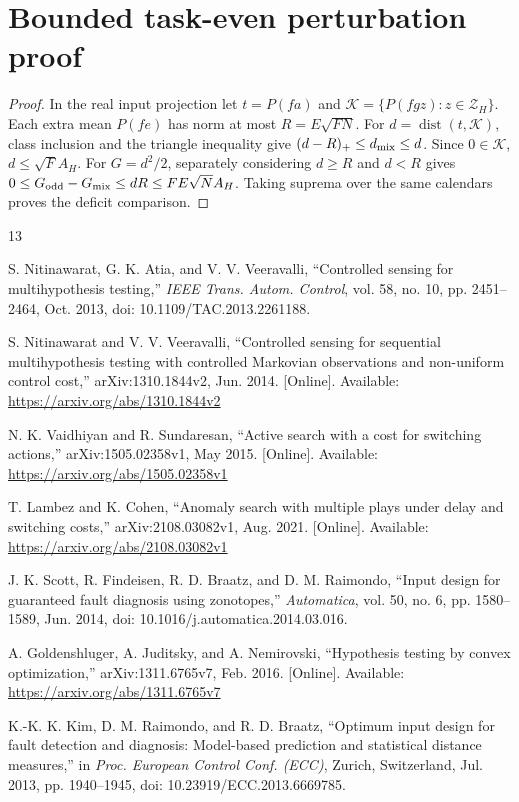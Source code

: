 \documentclass[journal]{IEEEtran}
\begin{document}
\section{Bounded task-even perturbation proof}\label{sf:even-proof}
\begin{proof}\leavevmode
In the real input projection let $t=P(fa)$ and
$\mathcal K=\{P(fgz):z\in\mathcal Z_H\}$.
Each extra mean $P(fe)$ has norm at most $R=E\sqrt{FN}$.
For $d=\operatorname{dist}(t,\mathcal K)$, class inclusion and the triangle
inequality give $(d-R)_+\le d_{\rm mix}\le d$.
Since $0\in\mathcal K$, $d\le\sqrt F A_H$.
For $G=d^2/2$, separately considering $d\ge R$ and $d<R$ gives
$0\le G_{\rm odd}-G_{\rm mix}\le dR\le FE\sqrt N A_H$.
Taking suprema over the same calendars proves the deficit comparison.
\end{proof}
\begin{thebibliography}{13}

S. Nitinawarat, G. K. Atia, and V. V. Veeravalli,
``Controlled sensing for multihypothesis testing,''
\emph{IEEE Trans. Autom. Control}, vol. 58, no. 10,
pp. 2451--2464, Oct. 2013, doi: 10.1109/TAC.2013.2261188.

S. Nitinawarat and V. V. Veeravalli,
``Controlled sensing for sequential multihypothesis testing with controlled
Markovian observations and non-uniform control cost,''
arXiv:1310.1844v2, Jun. 2014.
[Online]. Available: \url{https://arxiv.org/abs/1310.1844v2}

N. K. Vaidhiyan and R. Sundaresan,
``Active search with a cost for switching actions,''
arXiv:1505.02358v1, May 2015.
[Online]. Available: \url{https://arxiv.org/abs/1505.02358v1}

T. Lambez and K. Cohen,
``Anomaly search with multiple plays under delay and switching costs,''
arXiv:2108.03082v1, Aug. 2021.
[Online]. Available: \url{https://arxiv.org/abs/2108.03082v1}

J. K. Scott, R. Findeisen, R. D. Braatz, and D. M. Raimondo,
``Input design for guaranteed fault diagnosis using zonotopes,''
\emph{Automatica}, vol. 50, no. 6, pp. 1580--1589, Jun. 2014,
doi: 10.1016/j.automatica.2014.03.016.

A. Goldenshluger, A. Juditsky, and A. Nemirovski,
``Hypothesis testing by convex optimization,''
arXiv:1311.6765v7, Feb. 2016.
[Online]. Available: \url{https://arxiv.org/abs/1311.6765v7}

K.-K. K. Kim, D. M. Raimondo, and R. D. Braatz,
``Optimum input design for fault detection and diagnosis: Model-based prediction
and statistical distance measures,'' in \emph{Proc. European Control Conf. (ECC)},
Zurich, Switzerland, Jul. 2013, pp. 1940--1945,
doi: 10.23919/ECC.2013.6669785.


\end{thebibliography}
\end{document}
